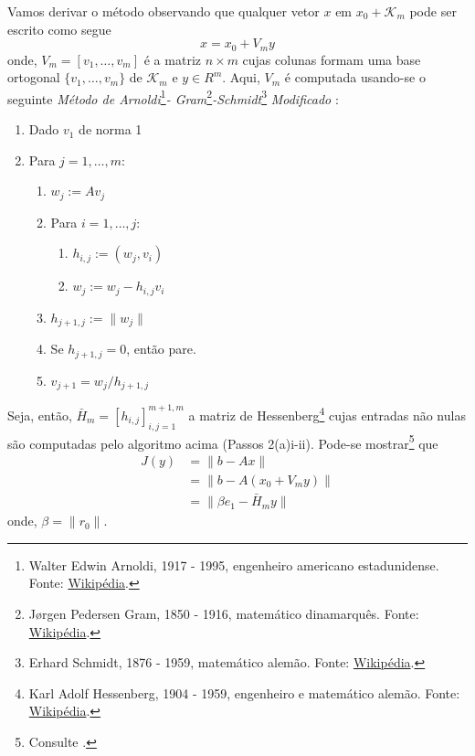 Vamos derivar o método observando que qualquer vetor $x$ em $x_0 + \mathcal{K}_m$ pode ser escrito como segue
\begin{equation}
  x = x_0 + V_my
\end{equation}
onde, $V_m = [v_1,\dotsc,v_m]$ é a matriz $n\times m$ cujas colunas formam uma base ortogonal $\{v_1, \dotsc, v_m\}$ de $\mathcal{K}_m$ e $y\in R^m$. Aqui, $V_m$ é computada usando-se o seguinte \emph{Método de Arnoldi}\footnote{Walter Edwin Arnoldi, 1917 - 1995, engenheiro americano estadunidense. Fonte: \href{https://pt.wikipedia.org/wiki/Walter_Edwin_Arnoldi}{Wikipédia}.}\emph{- Gram}\footnote{Jørgen Pedersen Gram, 1850 - 1916, matemático dinamarquês. Fonte: \href{https://pt.wikipedia.org/wiki/J\%C3\%B8rgen_Pedersen_Gram}{Wikipédia}.}\emph{-Schmidt}\footnote{Erhard Schmidt, 1876 - 1959, matemático alemão. Fonte: \href{https://pt.wikipedia.org/wiki/Erhard_Schmidt}{Wikipédia}.} \emph{Modificado} \cite[Subseção 6.3]{Saad2003}:
\begin{enumerate}[1.]
\item Dado $v_1$ de norma 1
\item Para $j=1,\dotsc,m$:
  \begin{enumerate}
  \item $w_j := Av_j$
  \item Para $i=1,\dotsc,j$:
    \begin{enumerate}
    \item $h_{i,j} := (w_j,v_i)$
    \item $w_j := w_j - h_{i,j}v_i$
    \end{enumerate}
  \item $h_{j+1,j} := \|w_j\|$
  \item Se $h_{j+1,j}=0$, então pare.
  \item $v_{j+1} = w_j/h_{j+1,j}$
\end{enumerate}
\end{enumerate}

Seja, então, $\bar{H}_m = [h_{i,j}]_{i,j=1}^{m+1,m}$ a matriz de Hessenberg\footnote{Karl Adolf Hessenberg, 1904 - 1959, engenheiro e matemático alemão. Fonte: \href{https://pt.wikipedia.org/wiki/Karl_Hessenberg}{Wikipédia}.} cujas entradas não nulas são computadas pelo algoritmo acima (Passos 2(a)i-ii). Pode-se mostrar\footnote{Consulte \cite[Proposição 6.5]{Saad2003}.} que
\begin{align}
  J(y) &= \|b-Ax\|\\
       &= \|b - A(x_0 + V_my)\|\\
       &= \|\beta e_1 - \bar{H}_my\|
\end{align}
onde, $\beta = \|r_0\|$.

